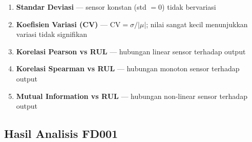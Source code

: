 \documentclass[11pt,a4paper]{article}
\begin{document}
\begin{enumerate}[noitemsep]
  \item \textbf{Standar Deviasi} --- sensor konstan (std $= 0$) tidak bervariasi
  \item \textbf{Koefisien Variasi (CV)} --- $\text{CV} = \sigma/|\mu|$;
    nilai sangat kecil menunjukkan variasi tidak signifikan
  \item \textbf{Korelasi Pearson vs RUL} --- hubungan linear sensor terhadap output
  \item \textbf{Korelasi Spearman vs RUL} --- hubungan monoton sensor terhadap output
  \item \textbf{Mutual Information vs RUL} --- hubungan non-linear sensor terhadap output
\end{enumerate}

\subsection{Hasil Analisis FD001}
\end{document}
